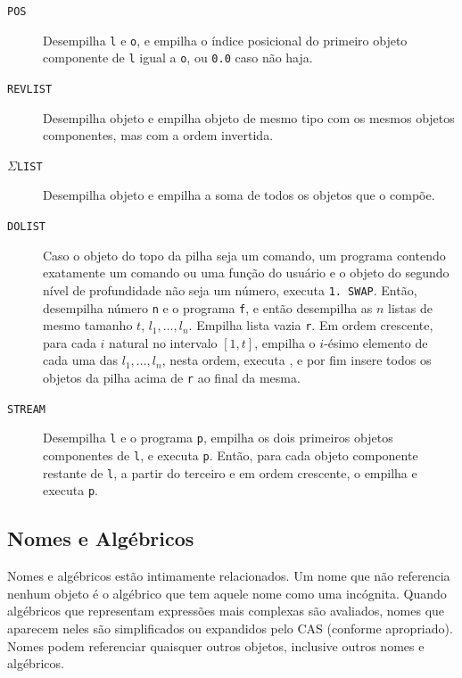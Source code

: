 \documentclass[12pt,a4paper]{report}
\newcommand{\kwd}[1]{\texttt{\textcolor{keyword}{#1}}}
\newcommand{\SWAP}{\kwd{SWAP}}   %
\newcommand{\POS}{\kwd{POS}}   %
\newcommand{\REVLIST}{\kwd{REVLIST}}   %
\newcommand{\SIGMALIST}{\kwd{$\Sigma$LIST}}   %
\newcommand{\DOLIST}{\kwd{DOLIST}} %
\newcommand{\STREAM}{\kwd{STREAM}} %
\numberwithin{theorem}{chapter}
\begin{document}
\begin{description}
  \item[\POS]\label{POS} Desempilha \texttt{l} e \texttt{o}, e empilha
    o índice posicional do primeiro objeto componente de \texttt{l}
    igual a \texttt{o}, ou \texttt{0.0} caso não haja.

  \item[\REVLIST]\label{REVLIST} Desempilha objeto e empilha objeto de
    mesmo tipo com os mesmos objetos componentes, mas com a ordem
    invertida.

  \item[\SIGMALIST]\label{SIGMALIST} Desempilha objeto e empilha a
    soma de todos os objetos que o compõe.

  \item[\DOLIST]\label{DOLIST} Caso o objeto do topo da pilha seja um
    comando, um programa contendo exatamente um comando ou uma função
    do usuário e o objeto do segundo nível de profundidade não seja um
    número, executa \texttt{1. \SWAP}.  Então, desempilha número
    \texttt{n} e o programa \texttt{f}, e então desempilha as \(n\)
    listas de mesmo tamanho \(t\), \(l_1,\ldots,l_n\).  Empilha lista
    vazia \texttt{r}.  Em ordem crescente, para cada \(i\) natural no
    intervalo \([1, t]\), empilha o \(i\)-ésimo elemento de cada uma
    das \(l_1,\ldots,l_n\), nesta ordem, executa , e por fim
    insere todos os objetos da pilha acima de \texttt{r} ao final da
    mesma.

  \item[\STREAM]\label{STREAM} Desempilha \texttt{l} e o programa
    \texttt{p}, empilha os dois primeiros objetos componentes de
    \texttt{l}, e executa \texttt{p}.  Então, para cada objeto
    componente restante de \texttt{l}, a partir do terceiro e em ordem
    crescente, o empilha e executa \texttt{p}.

\end{description}

\subsection{Nomes e Algébricos}

Nomes e algébricos estão intimamente relacionados.  Um nome que não
referencia nenhum objeto é o algébrico que tem aquele nome como uma
incógnita.  Quando algébricos que representam expressões mais
complexas são avaliados, nomes que aparecem neles são simplificados ou
expandidos pelo CAS (conforme apropriado).  Nomes podem referenciar
quaisquer outros objetos, inclusive outros nomes e algébricos.
\end{document}
